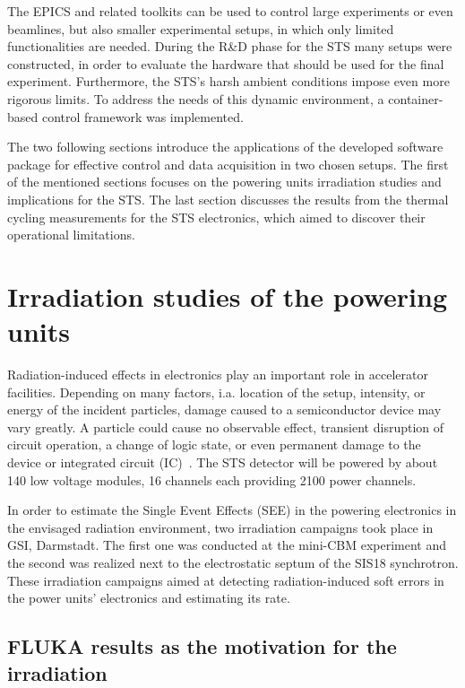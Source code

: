 The \gls{EPICS} and related toolkits can be used to control large experiments or even beamlines, but also smaller experimental setups, in which only limited functionalities are needed. During the R\&D phase for the \gls{STS} many setups were constructed, in order to evaluate the hardware that should be used for the final experiment. Furthermore, the \gls{STS}'s harsh ambient conditions impose even more rigorous limits. To address the needs of this dynamic environment, a container-based control framework was implemented. 

The two following sections introduce the applications of the developed software package for effective control and data acquisition in two chosen setups. The first of the mentioned sections focuses on the powering units irradiation studies and implications for the \gls{STS}. The last section discusses the results from the thermal cycling measurements for the \gls{STS} electronics, which aimed to discover their operational limitations. 

\section{Irradiation studies of the powering units}

Radiation-induced effects in electronics play an important role in accelerator facilities. Depending on many factors, i.a. location of the setup, intensity, or energy of the incident particles, damage caused to a semiconductor device may vary greatly. A particle could cause no observable effect, transient disruption of circuit operation, a change of logic state, or even permanent damage to the device or integrated circuit (IC)~\cite{dodd}. The \gls{STS} detector will be powered by about 140 low voltage modules, 16 channels each providing 2100 power channels.

In order to estimate the Single Event Effects (\gls{SEE}) in the powering electronics in the envisaged radiation environment, two irradiation campaigns took place in \gls{GSI}, Darmstadt.  The first one was conducted at the mini-CBM experiment and the second was realized next to the electrostatic septum of the SIS18 synchrotron. These irradiation campaigns aimed at detecting radiation-induced soft errors in the power units' electronics and estimating its rate.

\subsection{FLUKA results as the motivation for the irradiation}

